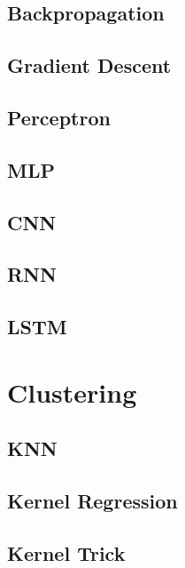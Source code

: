 \documentclass[18pt,a3paper,landscape, ncols=2]{cheatsheet}
\begin{document}
	\subsection{Backpropagation}
		\begin{mdframed}
		\end{mdframed}
	\subsection{Gradient Descent}
		\begin{mdframed}
		\end{mdframed}
	\subsection{Perceptron}
		\begin{mdframed}
		\end{mdframed}
	\subsection{MLP}
		\begin{mdframed}
		\end{mdframed}
	\subsection{CNN}
		\begin{mdframed}
		\end{mdframed}
	\subsection{RNN}
		\begin{mdframed}
		\end{mdframed}
	\subsection{LSTM}
		\begin{mdframed}
		\end{mdframed}

\vfill\null %
\columnbreak %

\section{Clustering} \seperator %
	\subsection{KNN}
		\begin{mdframed}
		\end{mdframed}
	\subsection{Kernel Regression}
		\begin{mdframed}
		\end{mdframed}
	\subsection{Kernel Trick}
		\begin{mdframed}
		\end{mdframed}

\end{document}
